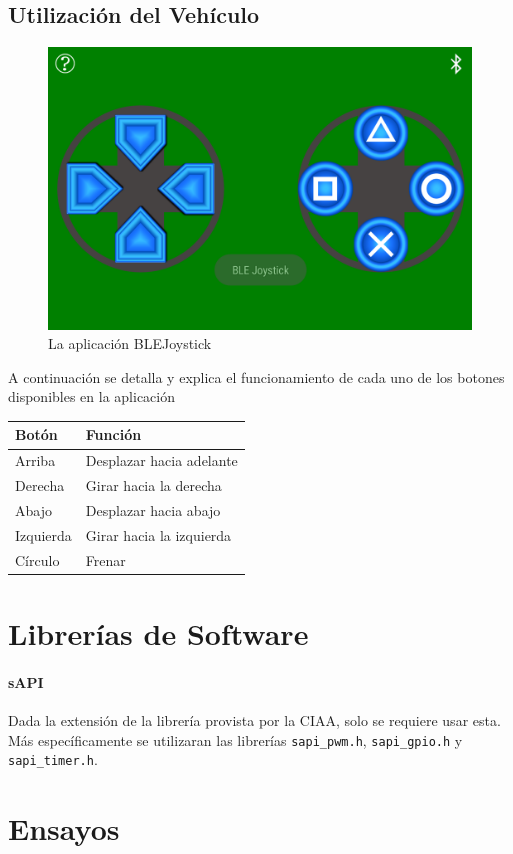 \subsection{Utilización del Vehículo}

\begin{figure}[H]
	\centering
	\includegraphics[width=0.7\linewidth]{informe_2/interfaz_joystick}
	\caption{La aplicación BLEJoystick}
	\label{fig:interfazjoystick}
\end{figure}

A continuación se detalla y explica el funcionamiento 
de cada uno de los botones disponibles en la aplicación
\begin{longtable}[]{@{}ll@{}}
	\toprule
	Botón & Función\tabularnewline
	\midrule
	\endhead
	Arriba & Desplazar hacia adelante\tabularnewline
	Derecha & Girar hacia la derecha\tabularnewline
	Abajo & Desplazar hacia abajo\tabularnewline
	Izquierda & Girar hacia la izquierda\tabularnewline
	Círculo & Frenar\tabularnewline
	\bottomrule
\end{longtable}

\section{Librerías de Software}

\paragraph{sAPI} Dada la extensión de la librería provista por la CIAA, solo se requiere
usar esta. Más específicamente se utilizaran las librerías
\texttt{sapi\_pwm.h}, \texttt{sapi\_gpio.h}
y \texttt{sapi\_timer.h}.

\section{Ensayos}

